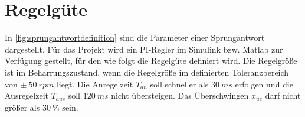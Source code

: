 \documentclass[./\jobname.tex]{subfiles}
\begin{document}
\section{Regelgüte}\label{sec: regelguete}
In \autoref{fig:sprungantwortdefinition} sind die Parameter einer Sprungantwort dargestellt. Für das Projekt wird ein PI-Regler im Simulink bzw. Matlab zur Verfügung gestellt, für den wie folgt die Regelgüte definiert wird. Die Regelgröße ist im Beharrungszustand, wenn die Regelgröße im definierten Toleranzbereich von \(\pm~50~rpm\) liegt. Die Anregelzeit \(T_{an}\) soll schneller als \(30~ms\) erfolgen und die Ausregelzeit \(T_{aus}\) soll \(120~ms\) nicht übersteigen. Das Überschwingen \(x_{ue}\) darf nicht größer als \(30~\%\) sein. 
\begin{figure}[H]
		\centering
	\noindent{}
	\label{fig:sprungantwortdefinition}
\end{figure}
\end{document}
